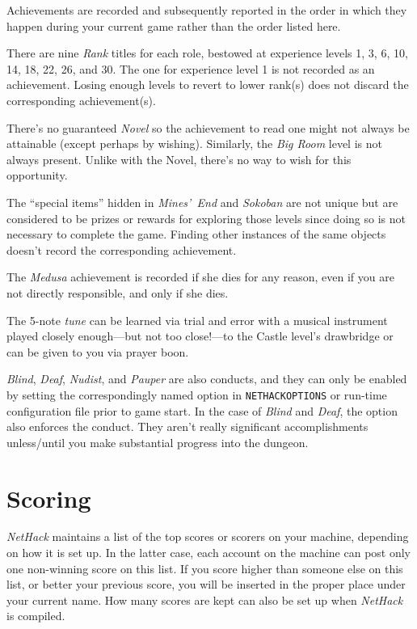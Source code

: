 \documentclass[titlepage]{article}
\begin{document}
Achievements are recorded and subsequently reported in the order in which
they happen during your current game rather than the order listed here.

There are nine \textit{Rank} titles for each role, bestowed at experience
levels 1, 3, 6, 10, 14, 18, 22, 26, and 30.
The one for experience level 1 is not recorded as an achievement.
Losing enough levels to revert to lower rank(s) does not discard the
corresponding achievement(s).

There's no guaranteed \textit{Novel} so the achievement to read one might
not always be attainable (except perhaps by wishing).
Similarly, the \textit{Big Room} level is not always present.
Unlike with the Novel, there's no way to wish for this opportunity.

The ``special items'' hidden in \textit{Mines'~End} and \textit{Sokoban}
are not unique but are considered to be prizes or rewards
for exploring those levels since doing so is not necessary to complete
the game.
Finding other instances of the same objects doesn't record the
corresponding achievement.

The \textit{Medusa} achievement is recorded if she dies for any reason,
even if you are not directly responsible, and only if she dies.

The 5-note \textit{tune} can be learned via trial and error with a musical
instrument played closely
enough---but not too close!---to
the Castle level's drawbridge or can be given to you via prayer boon.

\textit{Blind}, \textit{Deaf}, \textit{Nudist}, and \textit{Pauper} are also conducts, and they can only be
enabled by setting the correspondingly named option in \texttt{NETHACKOPTIONS}
or run-time configuration file prior to game start.
In the case of \textit{Blind} and \textit{Deaf}, the option also enforces the
conduct.
They aren't really significant accomplishments unless/until you make
substantial progress into the dungeon.

\section{Scoring}

\textit{NetHack} maintains a list of the top scores or scorers on your machine,
depending on how it is set up.  In the latter case, each account on
the machine can post only one non-winning score on this list.  If
you score higher than someone else on this list, or better your
previous score, you will be inserted in the proper place under your
current name.  How many scores are kept can also be set up when
\textit{NetHack} is compiled.
\end{document}
